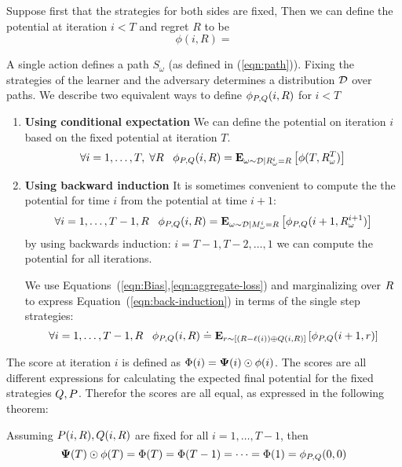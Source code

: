 \documentclass{article}[12pt]
\begin{document}
Suppose first that the strategies for both sides are fixed,  Then we
can define the potential at iteration $i<T$ and regret $R$ to be
\[
\phi(i,R) = 
\]

 A single action defines a path $S_\omega$ (as defined in (\ref{eqn:path})). Fixing
 the strategies of the learner and the adversary determines
 a distribution ${\cal D}$ over paths.
We describe two equivalent ways to define $\phi_{P,Q}(i,R)$ for $i<T$
 \begin{enumerate}
 \item{\bf Using conditional expectation} We can define the potential
   on iteration $i$ based on the fixed potential at iteration $T$.
\begin{equation}
  \forall i=1,\ldots,T,\; \forall R \;\;\;
  \phi_{P,Q}(i,R)={\bf E}_{\omega\sim {\cal D}|R_\omega^i=R}\left[ \phi(T,R_{\omega}^T) \right]
\end{equation}
 \item{\bf Using backward induction} It is sometimes convenient to
   compute the the potential for time $i$ from the potential at time
   $i+1$:
   \begin{equation} \label{eqn:back-induction}
     \forall i=1,\ldots,T-1, R\;\;\;
     \phi_{P,Q}(i,R)={\bf E}_{\omega\sim {\cal D}|M_\omega^i=R}\left[ \phi_{P,Q}(i+1,R_{\omega}^{i+1}) \right]
   \end{equation}
by using backwards induction: $i=T-1,T-2,\ldots,1$ we can compute the
potential for all iterations.


We use Equations~(\ref{eqn:Bias},\ref{eqn:aggregate-loss}) and
marginalizing over $R$ to express Equation~(\ref{eqn:back-induction})
in terms of the single step strategies:
\begin{equation} \label{eqn:induction}
  \forall i=1,\ldots,T-1, R\;\;\;
  \phi_{P,Q}(i,R) \doteq {\bf E}_{r \sim [(R-\ell(i)) \oplus Q(i,R)]}\left[ \phi_{P,Q}(i+1,r) \right]
\end{equation}

\end{enumerate}

The score at iteration $i$ is defined as
$\Phi(i)={\bf \Psi}(i)\odot \phi(i)$. The scores are all different
expressions for calculating the expected final potential for the fixed strategies
$Q, P$. Therefor the scores are all equal, as expressed
in the following theorem:

\begin{theorem} \label{thm:backward-recursion}
Assuming $ P(i,R), Q(i,R)$ are fixed for all
$i=1,\ldots,T-1$, then
\[
  {\bf \Psi}(T)\odot \phi(T)=\Phi(T)=\Phi(T-1)=\cdots=\Phi(1)=\phi_{P,Q}(0,0)
  \]
\end{theorem}
\end{document}
